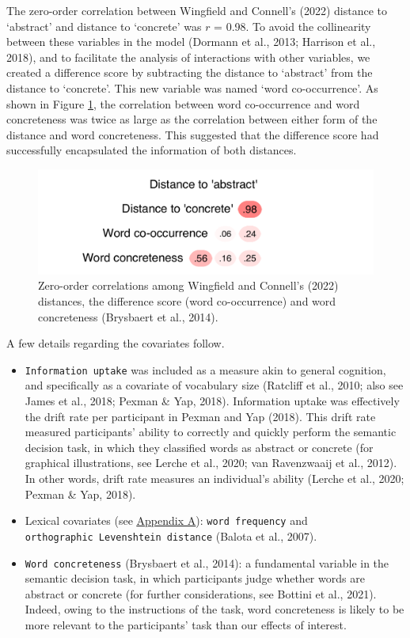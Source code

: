 \documentclass[
  12pt,
  man,floatsintext]{apa7}
\begin{document}
The zero-order correlation between Wingfield and Connell's (2022) distance to `abstract' and distance to `concrete' was \(r\) = 0.98. To avoid the collinearity between these variables in the model (Dormann et al., 2013; Harrison et al., 2018), and to facilitate the analysis of interactions with other variables, we created a difference score by subtracting the distance to `abstract' from the distance to `concrete'. This new variable was named `word co-occurrence'. As shown in Figure \ref{fig:semanticdecision-cooccurrence-correlations}, the correlation between word co-occurrence and word concreteness was twice as large as the correlation between either form of the distance and word concreteness. This suggested that the difference score had successfully encapsulated the information of both distances.

\begin{figure}

{\centering \includegraphics[width=0.63\linewidth]{thesis-core_files/figure-latex/semanticdecision-cooccurrence-correlations-1} 

}

\caption{Zero-order correlations among Wingfield and Connell's (2022) distances, the difference score (word co-occurrence) and word concreteness (Brysbaert et al., 2014).}\label{fig:semanticdecision-cooccurrence-correlations}
\end{figure}

A few details regarding the covariates follow.

\begin{itemize}
\item
  \texttt{Information\ uptake} was included as a measure akin to general cognition, and specifically as a covariate of vocabulary size (Ratcliff et al., 2010; also see James et al., 2018; Pexman \& Yap, 2018). Information uptake was effectively the drift rate per participant in Pexman and Yap (2018). This drift rate measured participants' ability to correctly and quickly perform the semantic decision task, in which they classified words as abstract or concrete (for graphical illustrations, see Lerche et al., 2020; van Ravenzwaaij et al., 2012). In other words, drift rate measures an individual's ability (Lerche et al., 2020; Pexman \& Yap, 2018).
\item
  Lexical covariates (see \protect\hyperlink{appendix-A-lexical-covariates}{\underline{Appendix A}}): \texttt{word\ frequency} and \texttt{orthographic\ Levenshtein\ distance} (Balota et al., 2007).
\item
  \texttt{Word\ concreteness} (Brysbaert et al., 2014): a fundamental variable in the semantic decision task, in which participants judge whether words are abstract or concrete (for further considerations, see Bottini et al., 2021). Indeed, owing to the instructions of the task, word concreteness is likely to be more relevant to the participants' task than our effects of interest.
\end{itemize}
\end{document}
